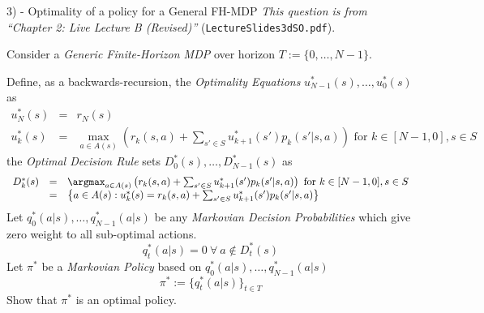\documentclass[11pt,a4paper]{article}
\begin{document}
\newpage
\begin{question}{3) - Optimality of a policy for a General FH-MDP}
  \textit{This question is from ``Chapter 2: Live Lecture B (Revised)''} (\texttt{LectureSlides3dSO.pdf}).
  \par Consider a \textit{Generic Finite-Horizon MDP} over horizon $T:=\{0,\dots,N-1\}$.
  \par Define, as a backwards-recursion, the \textit{Optimality Equations} $u_{N-1}^*(s),\dots,u_0^*(s)$ as
  \[\begin{array}{rcl}
    u_N^*(s)&=&r_N(s)\\
    u_k^*(s)&=&\max_{a\in A(s)}\left(r_k(s,a)+\sum_{s'\in S}u_{k+1}^*(s')p_k(s'|s,a)\right)\text{ for }k\in[N-1,0],s\in S
  \end{array}\]
  the \textit{Optimal Decision Rule} sets $D_0^*(s),\dots,D_{N-1}^*(s)$ as
  \[\begin{array}{rcl}
    D_k^*(s)&=&\argmax_{a\in A(s)}\left(r_k(s,a)+\sum_{s'\in S}u_{k+1}^*(s')p_k(s'|s,a)\right)\text{ for }k\in[N-1,0],s\in S\\
    &=&\left\{a\in A(s):u_k^*(s)=r_k(s,a)+\sum_{s'\in S}u_{k+1}^*(s')p_k(s'|s,a)\right\}
  \end{array}\]
  Let $q_0^*(a|s),\dots,q_{N-1}^*(a|s)$ be any \textit{Markovian Decision Probabilities} which give zero weight to all sub-optimal actions.
  \[ q_t^*(a|s)=0\ \forall\ a\not\in D_t^*(s) \]
  Let $\pi^*$ be a \textit{Markovian Policy} based on $q_0^*(a|s),\dots,q_{N-1}^*(a|s)$
  \[ \pi^*:=\{q_t^*(a|s)\}_{t\in T} \]
  Show that $\pi^*$ is an optimal policy.
\end{question}
\end{document}
